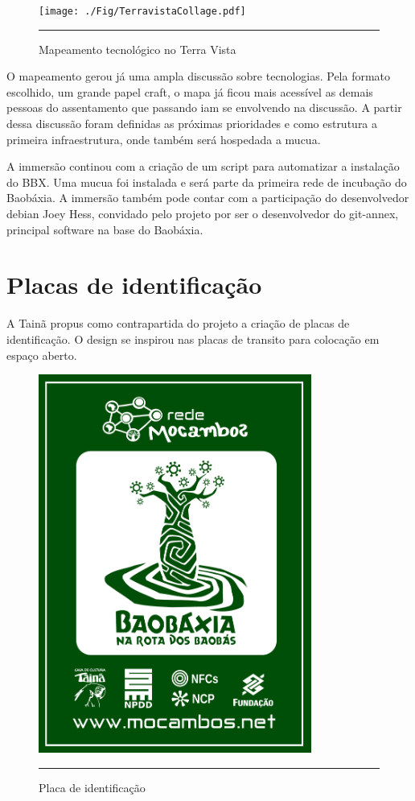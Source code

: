 \documentclass[a4paper, 11pt, oneside]{Relatorio_sem_2}  %
\begin{document}
\begin{figure}[htbp]
  \centering
  \texttt{[image: ./Fig/TerravistaCollage.pdf]}
  \rule{35em}{0.5pt}
  \caption[Mapeamento tecnológico no Terra Vista]{Mapeamento tecnológico no Terra Vista}
  \label{fig:MapTechTerraVista}
\end{figure}

O mapeamento gerou já uma ampla discussão sobre tecnologias. Pela
formato escolhido, um grande papel craft, o mapa já ficou mais
acessível as demais pessoas do assentamento que passando iam se
envolvendo na discussão. A partir dessa discussão foram definidas as
próximas prioridades e como estrutura a primeira infraestrutura, onde
também será hospedada a mucua.

A immersão continou com a criação de um script para automatizar a
instalação do BBX. Uma mucua foi instalada e será parte da primeira
rede de incubação do Baobáxia. A immersão também pode contar com a
participação do desenvolvedor debian Joey Hess, convidado pelo projeto
por ser o desenvolvedor do git-annex, principal software na base do
Baobáxia.

\section{Placas de identificação}
A Tainã propus como contrapartida do projeto a criação de placas de
identificação. O design se inspirou nas placas de transito para
colocação em espaço aberto. 

\begin{figure}[htbp]
  \centering
  \includegraphics[width=0.8\textwidth]{./Fig/PlacaBBX.pdf}
  \rule{35em}{0.5pt}
  \caption[Placa de identificação]{Placa de identificação}
  \label{fig:Placa}
\end{figure}
 
\end{document}
